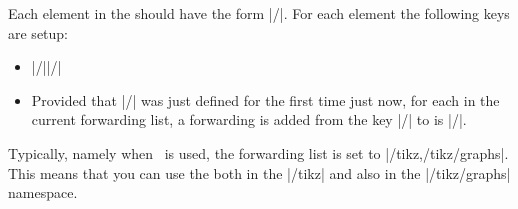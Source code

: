\begin{command}{\pgfgddeclareforwardedkeys{}}
  Each element in the  should have the
  form |/|. For each element the following
  keys are setup:

  \begin{itemize}
  \item {}|/||/|
  \item Provided that |/| was just defined
    for the first time just now, for each  in the current
    forwarding list, a forwarding is added from the key
    |/| to is |/|.
  \end{itemize}
  Typically, namely when \tikzname\ is used, the forwarding list is
  set to |/tikz,/tikz/graphs|. This means that you can use the
   both in the |/tikz| and also in the |/tikz/graphs|
  namespace.
\begin{codeexample}
\end{codeexample}
\end{command}


